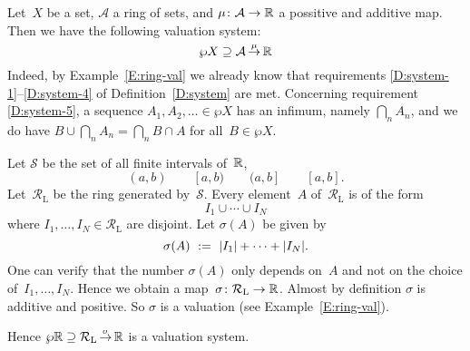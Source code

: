 \documentclass[main.tex]{subfiles}
\begin{document}
\begin{ex}
Let~$X$ be a set, 
$\mathcal{A}$ a ring of sets,
and $\mu\colon \mathcal{A}\rightarrow \mathbb{R}$
a possitive and additive map.
Then we have the following valuation system:
\begin{equation*}
\wp X \supseteq \mathcal{A}\,\smash{\stackrel{\mu}{\rightarrow}}\,\mathbb{R}
\end{equation*}
Indeed,
by Example~\ref{E:ring-val}
we already know that requirements
\ref{D:system-1}--\ref{D:system-4} of Definition~\ref{D:system} are met.
Concerning requirement \ref{D:system-5},
a sequence $A_1,A_2,\dotsc\in\wp X$
has an infimum,
namely $\bigcap_n A_n$,
and we do have $B \cup \bigcap_n A_n = \bigcap_n B\cap A$
for all~$B\in\wp X$.

\end{ex}

\begin{ex}
Let $\mathcal{S}$ be the set of all finite intervals of~$\mathbb{R}$,
\begin{equation*}
(a,b)\qquad [a,b)\qquad (a,b]\qquad [a,b].
\end{equation*}
Let~$\mathcal{R}_\mathrm{L}$ be the ring generated by~$\mathcal{S}$.
Every element~$A$ of~$\mathcal{R}_\mathrm{L}$ is of the form
\begin{equation*}
I_1 \cup \dotsb \cup I_N
\end{equation*}
where $I_1,\dotsc,I_N\in \mathcal{R}_\mathrm{L}$
are disjoint.
Let $\sigma(A)$ be given by
\begin{equation*}
\sigma(A) \ :=\  |I_1| + \dotsb + |I_N|.
\end{equation*}
One can verify that the number $\sigma(A)$
only depends on~$A$ and not on the choice of~$I_1,\dotsc,I_N$.
Hence we obtain a map~$\sigma\colon \mathcal{R}_\mathrm{L} \rightarrow \mathbb{R}$.
Almost by definition $\sigma$ is additive and positive.
So $\sigma$ is a valuation 
(see Example~\ref{E:ring-val}).

Hence $\wp \mathbb{R} \supseteq \mathcal{R}_\mathrm{L}\,\smash{\stackrel{\sigma}{\rightarrow}}\,\mathbb{R}$
is a valuation system.
\end{ex}
\end{document}
